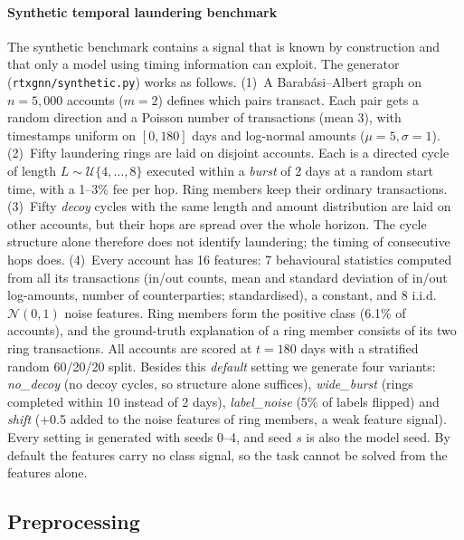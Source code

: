 \paragraph{Synthetic temporal laundering benchmark} The synthetic benchmark contains a signal that is known by construction and that only a model using timing information can exploit. The generator (\texttt{rtxgnn/synthetic.py}) works as follows.
(1)~A Barab\'asi--Albert graph on $n=5{,}000$ accounts ($m=2$) defines which pairs transact. Each pair gets a random direction and a Poisson number of transactions (mean 3), with timestamps uniform on $[0,180]$ days and log-normal amounts ($\mu=5,\sigma=1$).
(2)~Fifty laundering rings are laid on disjoint accounts. Each is a directed cycle of length $L\sim\mathcal{U}\{4,\dots,8\}$ executed within a \emph{burst} of 2 days at a random start time, with a 1--3\% fee per hop. Ring members keep their ordinary transactions.
(3)~Fifty \emph{decoy} cycles with the same length and amount distribution are laid on other accounts, but their hops are spread over the whole horizon. The cycle structure alone therefore does not identify laundering; the timing of consecutive hops does.
(4)~Every account has 16 features: 7 behavioural statistics computed from all its transactions (in/out counts, mean and standard deviation of in/out log-amounts, number of counterparties; standardised), a constant, and 8 i.i.d.\ $\mathcal{N}(0,1)$ noise features.
Ring members form the positive class (6.1\% of accounts), and the ground-truth explanation of a ring member consists of its two ring transactions. All accounts are scored at $t=180$ days with a stratified random 60/20/20 split.
Besides this \emph{default} setting we generate four variants: \emph{no\_decoy} (no decoy cycles, so structure alone suffices), \emph{wide\_burst} (rings completed within 10 instead of 2 days), \emph{label\_noise} (5\% of labels flipped) and \emph{shift} (+0.5 added to the noise features of ring members, a weak feature signal). Every setting is generated with seeds 0--4, and seed $s$ is also the model seed. By default the features carry no class signal, so the task cannot be solved from the features alone.


\subsection{Preprocessing}

